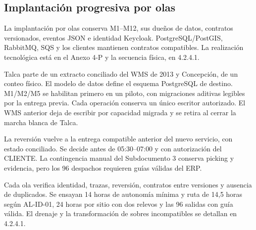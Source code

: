 \subsection{Implantación progresiva por olas}
\label{sec:transicion-laravel}

La implantación por olas conserva M1--M12, sus dueños de datos, contratos versionados, eventos JSON e identidad Keycloak. PostgreSQL/PostGIS, RabbitMQ, SQS y los clientes mantienen contratos compatibles. La realización tecnológica está en el Anexo 4-P y la secuencia física, en 4.2.4.1.

Talca parte de un extracto conciliado del WMS de 2013 y Concepción, de un conteo físico. El modelo de datos define el esquema PostgreSQL de destino. M1/M2/M5 se habilitan primero en un piloto, con migraciones aditivas legibles por la entrega previa. Cada operación conserva un único escritor autorizado. El WMS anterior deja de escribir por capacidad migrada y se retira al cerrar la marcha blanca de Talca.

La reversión vuelve a la entrega compatible anterior del nuevo servicio, con estado conciliado. Se decide antes de 05:30--07:00 y con autorización del CLIENTE. La contingencia manual del Subdocumento 3 conserva picking y evidencia, pero los 96 despachos requieren guías válidas del ERP.

Cada ola verifica identidad, trazas, reversión, contratos entre versiones y ausencia de duplicados. Se ensayan 14 horas de autonomía mínima y ruta de 14,5 horas según AL-ID-01, 24 horas por sitio con dos relevos y las 96 salidas con guía válida. El drenaje y la transformación de sobres incompatibles se detallan en 4.2.4.1.
